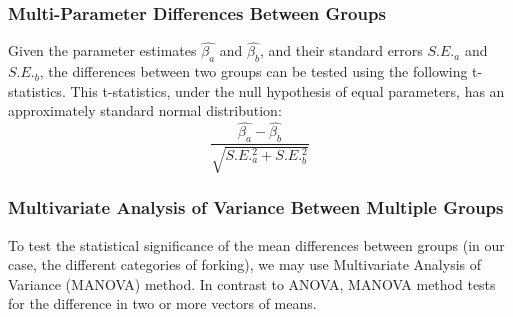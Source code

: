 \documentclass[12pt,letterpaper]{gthesis2}  %
\begin{document}
\subsubsection*{Multi-Parameter Differences Between Groups}
\label{multiParameterTest}
Given the parameter estimates $\hat{\beta_a}$ and $\hat{\beta_b}$, and their standard errors $S.E._a$ and $S.E._b$, the differences between two groups can be tested using the following t-statistics. This t-statistics, under the null hypothesis of equal parameters, has an approximately standard normal distribution:
\begin{equation}
\frac{\hat{\beta_a}-\hat{\beta_b}}{\sqrt{S.E._a^2 + S.E._b^2}}
\end{equation}

\subsubsection*{Multivariate Analysis of Variance Between Multiple Groups}
\label{MANOVA}
To test the statistical significance of the mean differences between groups (in our case, the different categories of forking), we may use Multivariate Analysis of Variance (MANOVA) method. In contrast to ANOVA, MANOVA method tests for the difference in two or more vectors of means.\\
\end{document}

